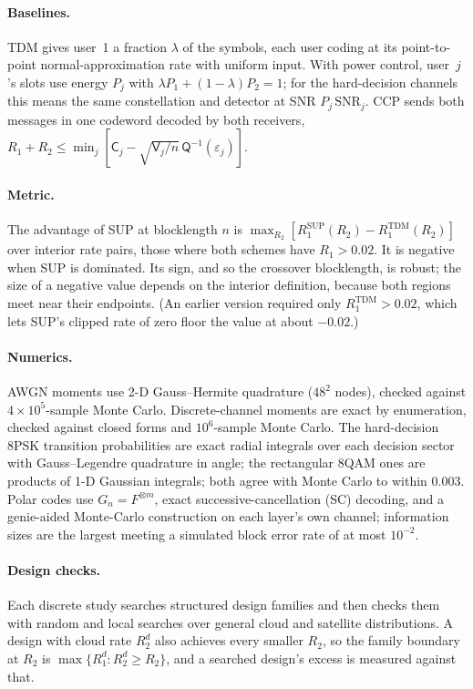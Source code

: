 \documentclass[11pt]{article}
\newcommand{\Csf}{\mathsf{C}}
\newcommand{\Vsf}{\mathsf{V}}
\newcommand{\Qinv}{\mathsf{Q}^{-1}}
\begin{document}
\paragraph{Baselines.} TDM gives user~1 a fraction $\lambda$ of the symbols, each user coding at its point-to-point normal-approximation rate with uniform input. With power control, user~$j$'s slots use energy $P_j$ with $\lambda P_1+(1-\lambda)P_2=1$; for the hard-decision channels this means the same constellation and detector at SNR $P_j\,\mathrm{SNR}_j$. CCP sends both messages in one codeword decoded by both receivers, $R_1+R_2\le\min_j[\Csf_j-\sqrt{\Vsf_j/n}\,\Qinv(\varepsilon_j)]$.
\paragraph{Metric.} The advantage of SUP at blocklength $n$ is $\max_{R_2}[R_1^{\mathrm{SUP}}(R_2)-R_1^{\mathrm{TDM}}(R_2)]$ over interior rate pairs, those where both schemes have $R_1>0.02$. It is negative when SUP is dominated. Its sign, and so the crossover blocklength, is robust; the size of a negative value depends on the interior definition, because both regions meet near their endpoints. (An earlier version required only $R_1^{\mathrm{TDM}}>0.02$, which lets SUP's clipped rate of zero floor the value at about $-0.02$.)
\paragraph{Numerics.} AWGN moments use 2-D Gauss--Hermite quadrature ($48^2$ nodes), checked against $4\times10^5$-sample Monte Carlo. Discrete-channel moments are exact by enumeration, checked against closed forms and $10^6$-sample Monte Carlo. The hard-decision 8PSK transition probabilities are exact radial integrals over each decision sector with Gauss--Legendre quadrature in angle; the rectangular 8QAM ones are products of 1-D Gaussian integrals; both agree with Monte Carlo to within $0.003$. Polar codes use $G_n=F^{\otimes m}$, exact successive-cancellation (SC) decoding, and a genie-aided Monte-Carlo construction on each layer's own channel; information sizes are the largest meeting a simulated block error rate of at most $10^{-2}$.
\paragraph{Design checks.} Each discrete study searches structured design families and then checks them with random and local searches over general cloud and satellite distributions. A design with cloud rate $R_2^{d}$ also achieves every smaller $R_2$, so the family boundary at $R_2$ is $\max\{R_1^d: R_2^d\ge R_2\}$, and a searched design's excess is measured against that.
\end{document}
